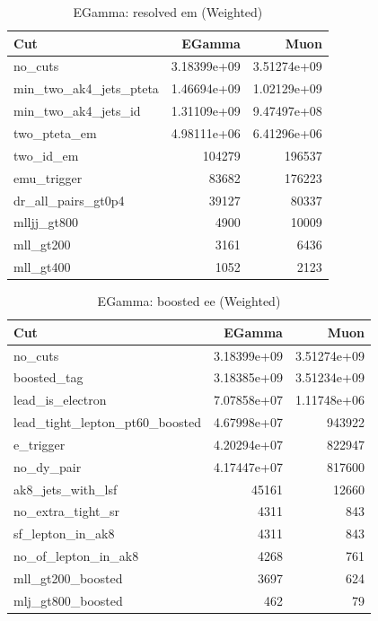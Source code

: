 \documentclass{article}
\begin{document}
\begin{table}[htbp]
\centering
\caption{EGamma: resolved em (Weighted)}
\begin{tabular}{lrr}
\hline
Cut & EGamma & Muon \\
\hline
no\_cuts & 3.18399e+09 & 3.51274e+09 \\
min\_two\_ak4\_jets\_pteta & 1.46694e+09 & 1.02129e+09 \\
min\_two\_ak4\_jets\_id & 1.31109e+09 & 9.47497e+08 \\
two\_pteta\_em & 4.98111e+06 & 6.41296e+06 \\
two\_id\_em & 104279 & 196537 \\
emu\_trigger & 83682 & 176223 \\
dr\_all\_pairs\_gt0p4 & 39127 & 80337 \\
mlljj\_gt800 & 4900 & 10009 \\
mll\_gt200 & 3161 & 6436 \\
mll\_gt400 & 1052 & 2123 \\
\hline
\end{tabular}
\end{table}

\begin{table}[htbp]
\centering
\caption{EGamma: boosted ee (Weighted)}
\begin{tabular}{lrr}
\hline
Cut & EGamma & Muon \\
\hline
no\_cuts & 3.18399e+09 & 3.51274e+09 \\
boosted\_tag & 3.18385e+09 & 3.51234e+09 \\
lead\_is\_electron & 7.07858e+07 & 1.11748e+06 \\
lead\_tight\_lepton\_pt60\_boosted & 4.67998e+07 & 943922 \\
e\_trigger & 4.20294e+07 & 822947 \\
no\_dy\_pair & 4.17447e+07 & 817600 \\
ak8\_jets\_with\_lsf & 45161 & 12660 \\
no\_extra\_tight\_sr & 4311 & 843 \\
sf\_lepton\_in\_ak8 & 4311 & 843 \\
no\_of\_lepton\_in\_ak8 & 4268 & 761 \\
mll\_gt200\_boosted & 3697 & 624 \\
mlj\_gt800\_boosted & 462 & 79 \\
\hline
\end{tabular}
\end{table}
\end{document}
